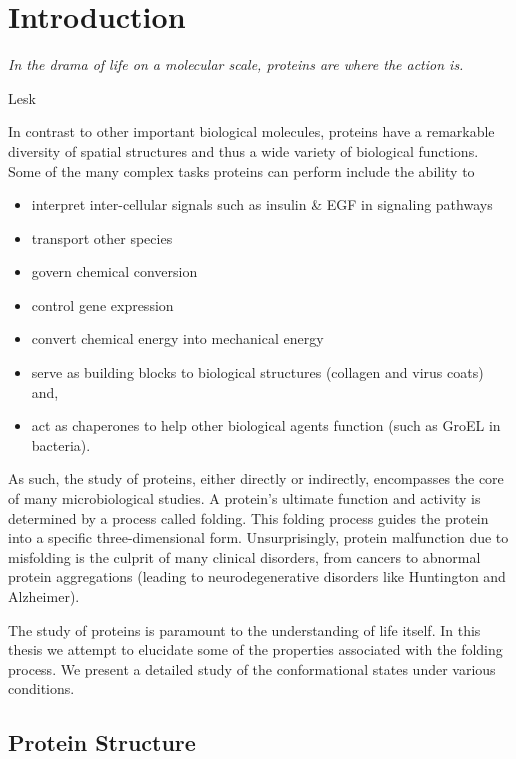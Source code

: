 \chapter{Introduction}
\vspace{-1em}
\epigraph{
  \textit{In the drama of life on a molecular scale, proteins are where the action is.}
}{Lesk\cite{lesk_introduction_2001}}
%
In contrast to other important biological molecules, proteins have a remarkable diversity of spatial structures and thus a wide variety of biological functions. Some of the many complex tasks proteins can perform include the ability to\cite{lodish_molecular_2004, echenique_introduction_2007}
\begin{itemize}
\item interpret inter-cellular signals such as insulin \& EGF in signaling pathways\cite{ghosh2006simulation, miller2007systems}
\item transport other species\cite{zakharov2009microrheological}
\item govern chemical conversion
\item control gene expression
\item convert chemical energy into mechanical energy
\item serve as building blocks to biological structures (\ie collagen and virus coats) and,
\item act as chaperones to help other biological agents function (such as GroEL in bacteria).
\end{itemize}
As such, the study of proteins, either directly or indirectly, encompasses the core of many microbiological studies. A protein's ultimate function and activity is determined by a process called folding. This folding process guides the protein into a specific three-dimensional form. Unsurprisingly, protein malfunction due to misfolding is the culprit of many clinical disorders, from cancers to abnormal protein aggregations (leading to neurodegenerative disorders like Huntington and Alzheimer\cite{uversky_intrinsic_2009}).

The study of proteins is paramount to the understanding of life itself. In this thesis we attempt to elucidate some of the properties associated with the folding process. We present a detailed study of the conformational states under various conditions.

\section{Protein Structure}

